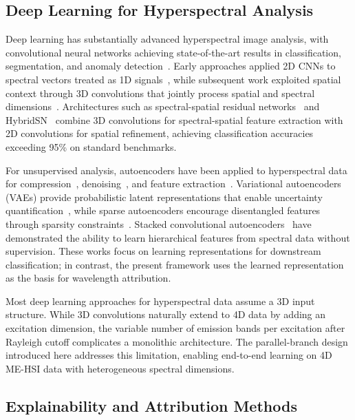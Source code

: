 \subsection{Deep Learning for Hyperspectral Analysis}
\label{sec:related_dl}

Deep learning has substantially advanced hyperspectral image analysis, with convolutional neural networks achieving state-of-the-art results in classification, segmentation, and anomaly detection~\cite{li2019deep,paoletti2019deep}.
Early approaches applied 2D CNNs to spectral vectors treated as 1D signals~\cite{hu2015deep}, while subsequent work exploited spatial context through 3D convolutions that jointly process spatial and spectral dimensions~\cite{chen2016deep}.
Architectures such as spectral-spatial residual networks~\cite{zhong2017spectral} and HybridSN~\cite{roy2020hybridsn} combine 3D convolutions for spectral-spatial feature extraction with 2D convolutions for spatial refinement, achieving classification accuracies exceeding 95\% on standard benchmarks.

For unsupervised analysis, autoencoders have been applied to hyperspectral data for compression~\cite{chen2014deep}, denoising~\cite{vincent2008extracting}, and feature extraction~\cite{mou2017unsupervised}.
Variational autoencoders (VAEs) provide probabilistic latent representations that enable uncertainty quantification~\cite{kingma2013auto}, while sparse autoencoders encourage disentangled features through sparsity constraints~\cite{ng2011sparse}.
Stacked convolutional autoencoders~\cite{masci2011stacked} have demonstrated the ability to learn hierarchical features from spectral data without supervision.
These works focus on learning representations for downstream classification; in contrast, the present framework uses the learned representation as the basis for wavelength attribution.

Most deep learning approaches for hyperspectral data assume a 3D input structure.
While 3D convolutions naturally extend to 4D data by adding an excitation dimension, the variable number of emission bands per excitation after Rayleigh cutoff complicates a monolithic architecture.
The parallel-branch design introduced here addresses this limitation, enabling end-to-end learning on 4D ME-HSI data with heterogeneous spectral dimensions.

\subsection{Explainability and Attribution Methods}
\label{sec:related_explain}

